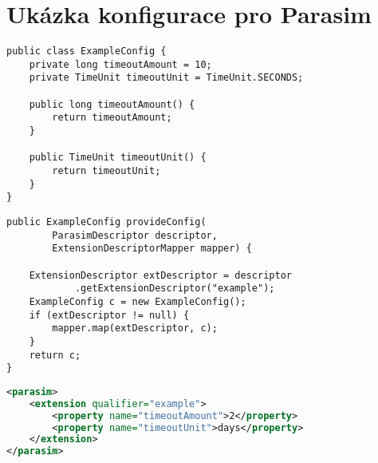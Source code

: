 \chapter{Ukázka konfigurace pro Parasim}\label{appendix:configuration}

\begin{lstlisting}[label={code:config:bean}, caption={Konfigurační třída}]
public class ExampleConfig {
	private long timeoutAmount = 10;
	private TimeUnit timeoutUnit = TimeUnit.SECONDS;

	public long timeoutAmount() {
		return timeoutAmount;
	}

	public TimeUnit timeoutUnit() {
		return timeoutUnit;
	}
}
\end{lstlisting}

\begin{lstlisting}[label={code:config:provide}, caption={Metoda poskytující konfiguraci}]
public ExampleConfig provideConfig(
		ParasimDescriptor descriptor,
		ExtensionDescriptorMapper mapper) {

	ExtensionDescriptor extDescriptor = descriptor
			.getExtensionDescriptor("example");
	ExampleConfig c = new ExampleConfig();
	if (extDescriptor != null) {
		mapper.map(extDescriptor, c);
	}
	return c;
}
\end{lstlisting}

\begin{lstlisting}[language=xml, label={code:config:xml}, caption={parasim.xml}]
<parasim>
	<extension qualifier="example">
		<property name="timeoutAmount">2</property>
		<property name="timeoutUnit">days</property>
	</extension>
</parasim>
\end{lstlisting}

